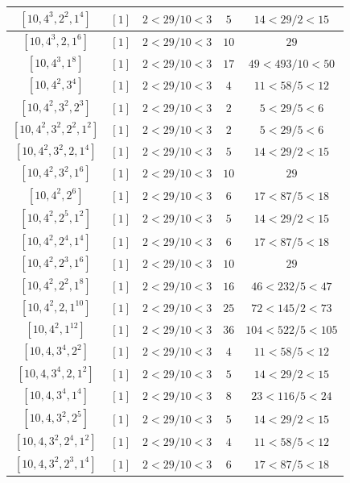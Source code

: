 \documentclass{article}%
\begin{document}
\begin{center}
\begin{longtable}{||c|c|c|c|c||}
$[10, 4^{3}, 2^{2}, 1^{4}]$ & $[1]$ & $2 < 29/10 < 3$ & $5$ & $14 < 29/2 < 15$ \\ \hline 
$[10, 4^{3}, 2, 1^{6}]$ & $[1]$ & $2 < 29/10 < 3$ & $10$ & $29$ \\ \hline 
$[10, 4^{3}, 1^{8}]$ & $[1]$ & $2 < 29/10 < 3$ & $17$ & $49 < 493/10 < 50$ \\ \hline 
$[10, 4^{2}, 3^{4}]$ & $[1]$ & $2 < 29/10 < 3$ & $4$ & $11 < 58/5 < 12$ \\ \hline 
$[10, 4^{2}, 3^{2}, 2^{3}]$ & $[1]$ & $2 < 29/10 < 3$ & $2$ & $5 < 29/5 < 6$ \\ \hline 
$[10, 4^{2}, 3^{2}, 2^{2}, 1^{2}]$ & $[1]$ & $2 < 29/10 < 3$ & $2$ & $5 < 29/5 < 6$ \\ \hline 
$[10, 4^{2}, 3^{2}, 2, 1^{4}]$ & $[1]$ & $2 < 29/10 < 3$ & $5$ & $14 < 29/2 < 15$ \\ \hline 
$[10, 4^{2}, 3^{2}, 1^{6}]$ & $[1]$ & $2 < 29/10 < 3$ & $10$ & $29$ \\ \hline 
$[10, 4^{2}, 2^{6}]$ & $[1]$ & $2 < 29/10 < 3$ & $6$ & $17 < 87/5 < 18$ \\ \hline 
$[10, 4^{2}, 2^{5}, 1^{2}]$ & $[1]$ & $2 < 29/10 < 3$ & $5$ & $14 < 29/2 < 15$ \\ \hline 
$[10, 4^{2}, 2^{4}, 1^{4}]$ & $[1]$ & $2 < 29/10 < 3$ & $6$ & $17 < 87/5 < 18$ \\ \hline 
$[10, 4^{2}, 2^{3}, 1^{6}]$ & $[1]$ & $2 < 29/10 < 3$ & $10$ & $29$ \\ \hline 
$[10, 4^{2}, 2^{2}, 1^{8}]$ & $[1]$ & $2 < 29/10 < 3$ & $16$ & $46 < 232/5 < 47$ \\ \hline 
$[10, 4^{2}, 2, 1^{10}]$ & $[1]$ & $2 < 29/10 < 3$ & $25$ & $72 < 145/2 < 73$ \\ \hline 
$[10, 4^{2}, 1^{12}]$ & $[1]$ & $2 < 29/10 < 3$ & $36$ & $104 < 522/5 < 105$ \\ \hline 
$[10, 4, 3^{4}, 2^{2}]$ & $[1]$ & $2 < 29/10 < 3$ & $4$ & $11 < 58/5 < 12$ \\ \hline 
$[10, 4, 3^{4}, 2, 1^{2}]$ & $[1]$ & $2 < 29/10 < 3$ & $5$ & $14 < 29/2 < 15$ \\ \hline 
$[10, 4, 3^{4}, 1^{4}]$ & $[1]$ & $2 < 29/10 < 3$ & $8$ & $23 < 116/5 < 24$ \\ \hline 
$[10, 4, 3^{2}, 2^{5}]$ & $[1]$ & $2 < 29/10 < 3$ & $5$ & $14 < 29/2 < 15$ \\ \hline 
$[10, 4, 3^{2}, 2^{4}, 1^{2}]$ & $[1]$ & $2 < 29/10 < 3$ & $4$ & $11 < 58/5 < 12$ \\ \hline 
$[10, 4, 3^{2}, 2^{3}, 1^{4}]$ & $[1]$ & $2 < 29/10 < 3$ & $6$ & $17 < 87/5 < 18$ \\ \hline 

\end{longtable}
\end{center}
\end{document}

